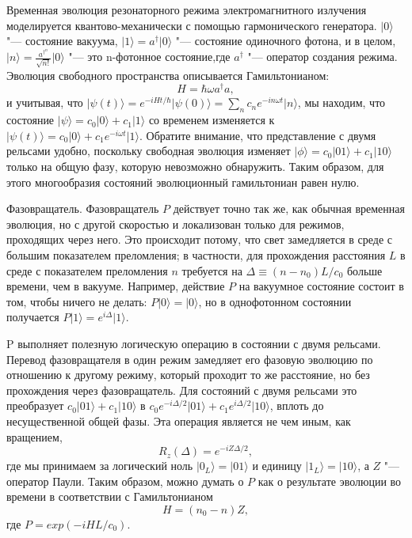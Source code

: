 \begin{multicols}{2}
{        Временная эволюция резонаторного режима электромагнитного излучения моделируется квантово-механически с помощью гармонического генератора.
        $\vert0\rangle$ "--- состояние вакуума, $\vert1\rangle=a^{\dagger}\vert0\rangle$ "--- состояние одиночного фотона, и в целом, $\vert n\rangle=\frac{a^{\dagger^n}}{\sqrt{n!}}\vert0\rangle$ "--- это n-фотонное состояние,где $a^{\dagger}$ "--- оператор создания режима. Эволюция свободного пространства описывается Гамильтонианом:
        \begin{equation}
            H=\hbar\omega a^{\dagger}a,
        \end{equation}
        и учитывая, что $\vert\psi(t)\rangle=e^{-iHt/\hbar}\vert \psi(0)\rangle=\sum_{n}^{} c_ne^{-in \omega t}\vert n\rangle$, мы находим, что состояние 
        $\vert\psi\rangle=c_0\vert0\rangle+c_1\vert1\rangle$ со временем изменяется к $\vert\psi(t)\rangle=c_0\vert0\rangle+c_1e^{-i\omega t}\vert1\rangle$.
        Обратите внимание, что представление с двумя рельсами удобно, поскольку свободная эволюция изменяет $\vert\phi\rangle=c_0\vert01\rangle+c_1\vert10\rangle$ только на общую фазу, которую невозможно обнаружить. Таким образом, для этого многообразия состояний эволюционный гамильтониан равен нулю.

        Фазовращатель. Фазовращатель $P$ действует точно так же, как обычная временная эволюция, но с другой скоростью и локализован только для режимов, проходящих через него. Это происходит потому, что свет замедляется в среде с большим показателем преломления; 
        в частности, для прохождения расстояния $L$ в среде с показателем преломления $n$ требуется на $\Delta\equiv(n-n_0)L/c_0$ больше времени, чем в вакууме. 
        Например, действие $P$ на вакуумное состояние состоит в том, чтобы ничего не делать: $P\vert0\rangle = \vert0\rangle$, но в однофотонном состоянии получается $P\vert1\rangle = e^{i\Delta}\vert1\rangle$. 

        P выполняет полезную логическую операцию в состоянии с двумя рельсами. Перевод фазовращателя в
        один режим замедляет его фазовую эволюцию по отношению к другому режиму, который проходит то же расстояние, но без прохождения через фазовращатель. Для состояний с двумя рельсами это преобразует 
        $c_0\vert01\rangle+c_1\vert10\rangle$ в $c_0e^{-i\Delta/2}\vert01\rangle+c_1e^{i\Delta/2}\vert10\rangle$, вплоть до несущественной общей фазы. Эта операция является не чем иным, как вращением,
        \begin{equation}
            R_{z}(\Delta)=e^{-iZ\Delta/2},
        \end{equation}
        где мы принимаем за логический ноль $\vert0_{L}\rangle=\vert01\rangle$ и единицу $\vert1_{L}\rangle=\vert10\rangle$, а $Z$ "--- оператор Паули. 
        Таким образом, можно думать о $P$ как о результате эволюции во времени в соответствии с Гамильтонианом
        \begin{equation}
            H=(n_0-n)Z,
        \end{equation}
        где $P=exp(-iHL/c_0).$

}
\end{multicols}
